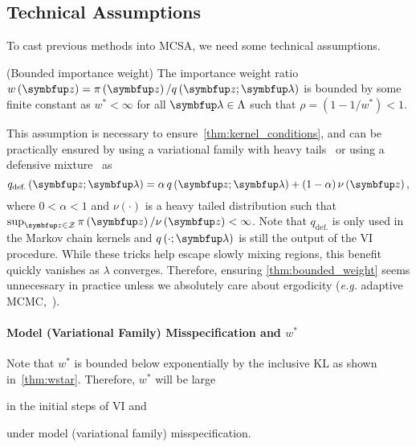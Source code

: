 \vspace{-1ex}
\subsection{Technical Assumptions}\label{section:assumption}
\vspace{-1ex}
To cast previous methods into MCSA, we need some technical assumptions.

\begin{assumption}{(Bounded importance weight)}\label{thm:bounded_weight}
  The importance weight ratio \(w\left(\vz\right) = \pi\left(\vz\right) / q\left(\vz; \vlambda\right)\) is bounded by some finite constant as \(w^* < \infty\) for all \(\vlambda \in \Lambda\) such that \(\rho = \left(1 - 1/w^*\right) < 1\).
\end{assumption}
\vspace{-0.05in}
This assumption is necessary to ensure~\cref{thm:kernel_conditions}, and can be practically ensured by using a variational family with heavy tails~\citep{NEURIPS2018_25db67c5} or using a defensive mixture~\citep{hesterberg_weighted_1995, holden_adaptive_2009} as
{\[
  q_{\text{def.}}\left(\vz; \vlambda \right) = \alpha \, q\left(\vz; \vlambda\right) + (1 - \alpha) \, \nu\left(\vz\right),
\]}%
where \(0 < \alpha < 1\) and \(\nu\left(\cdot\right)\) is a heavy tailed distribution such that \(\sup_{\vz \in \mathcal{Z}} \pi\left(\vz\right) / \nu\left(\vz\right) < \infty\).
Note that \(q_{\text{def.}}\) is only used in the Markov chain kernels and \(q\left(\cdot;\vlambda\right)\) is still the output of the VI procedure.
While these tricks help escape slowly mixing regions, this benefit quickly vanishes as \(\lambda\) converges.
Therefore, ensuring \cref{thm:bounded_weight} seems unnecessary in practice unless we absolutely care about ergodicity (\textit{e.g.} adaptive MCMC,~\citealt{holden_adaptive_2009, pmlr-v151-brofos22a}).

\vspace{-0.1in}
\paragraph{\textbf{Model (Variational Family) Misspecification and \(w^*\)}}
Note that \(w^*\) is bounded below exponentially by the inclusive KL as shown in~\cref{thm:wstar}.
Therefore, \(w^*\) will be large 
\begin{enumerate*}[label=\textbf{(\roman*)}]
    \item in the initial steps of VI and
    \item under model (variational family) misspecification.
\end{enumerate*}

